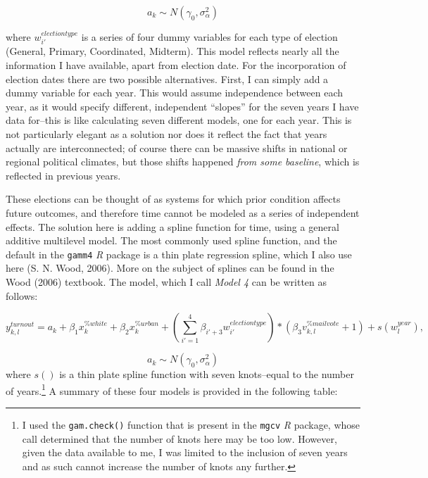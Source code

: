 \documentclass[12pt,twoside]{reedthesis}
\begin{document}
  \[a_{k} \sim N(\gamma_0, \sigma_{\alpha}^2)\]
  
  where \(w_{i'}^{election type}\) is a series of four dummy variables for
  each type of election (General, Primary, Coordinated, Midterm). This
  model reflects nearly all the information I have available, apart from
  election date. For the incorporation of election dates there are two
  possible alternatives. First, I can simply add a dummy variable for each
  year. This would assume independence between each year, as it would
  specify different, independent ``slopes'' for the seven years I have
  data for--this is like calculating seven different models, one for each
  year. This is not particularly elegant as a solution nor does it reflect
  the fact that years actually are interconnected; of course there can be
  massive shifts in national or regional political climates, but those
  shifts happened \emph{from some baseline}, which is reflected in
  previous years.
  
  These elections can be thought of as systems for which prior condition
  affects future outcomes, and therefore time cannot be modeled as a
  series of independent effects. The solution here is adding a spline
  function for time, using a general additive multilevel model. The most
  commonly used spline function, and the default in the \texttt{gamm4}
  \textit{R} package is a thin plate regression spline, which I also use
  here (S. N. Wood, 2006). More on the subject of splines can be found in
  the Wood (2006) textbook. The model, which I call \emph{Model 4} can be
  written as follows:
  
  \[y^{turnout}_{k,l} = a_{k} + \beta_{1}x_k^{\% white} + \beta_{2}x_k^{\% urban} + (\sum_{i'=1}^{4}\beta_{i'+3}w_{i'}^{election type})*(\beta_3v_{k,l}^{\% mail vote} + 1) + s(w^{year}_{l}),\]
  
  \[a_{k} \sim N(\gamma_0, \sigma_{\alpha}^2)\] where \(s()\) is a thin
  plate spline function with seven knots--equal to the number of
  years.\footnote{I used the \texttt{gam.check()} function that is present
    in the \texttt{mgcv} \textit{R} package, whose call determined that
    the number of knots here may be too low. However, given the data
    available to me, I was limited to the inclusion of seven years and as
    such cannot increase the number of knots any further.} A summary of
  these four models is provided in the following table:
  
\end{document}
